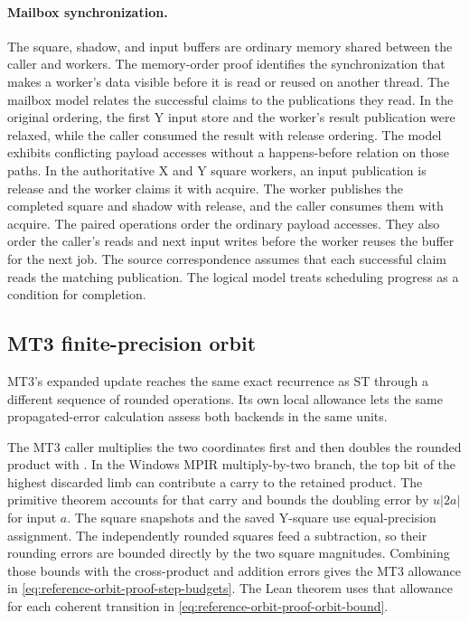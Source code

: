 \paragraph{Mailbox synchronization.}
The square, shadow, and input buffers are ordinary memory shared between
the caller and workers. The memory-order proof identifies the
synchronization that makes a worker's data visible before it is read or
reused on another thread.
The mailbox model relates the successful claims to the publications they
read. In the original ordering, the first Y input store and the worker's
result publication were relaxed, while the caller consumed the result with
release ordering. The model exhibits conflicting payload accesses without a
happens-before relation on those paths. In the authoritative X and Y square
workers, an input publication is release and the worker claims it with
acquire. The worker publishes the completed square and shadow with release,
and the caller consumes them with acquire. The paired operations order the
ordinary payload accesses. They also order the caller's reads and next
input writes before the worker reuses the buffer for the next job.
The source correspondence assumes that each successful claim reads the
matching publication. The logical model treats scheduling progress as a
condition for completion.

\subsection{MT3 finite-precision orbit}
\label{subsec:reference-orbit-proof-mt3-precision}

MT3's expanded update reaches the same exact recurrence as ST through a
different sequence of rounded operations. Its own local allowance lets the
same propagated-error calculation assess both backends in the same units.

The MT3 caller multiplies the two coordinates first and then doubles the
rounded product with . In the Windows MPIR multiply-by-two
branch, the top bit of the highest discarded limb can contribute a carry
to the retained product. The primitive theorem accounts for that carry
and bounds the doubling error by $u|2a|$ for input $a$. The square
snapshots and the saved Y-square use equal-precision assignment. The
independently rounded squares feed a subtraction, so their rounding errors are
bounded directly by the two square magnitudes. Combining those bounds with the
cross-product and addition errors gives the MT3 allowance in
\eqref{eq:reference-orbit-proof-step-budgets}. The Lean theorem
 uses that allowance for each coherent
transition in \eqref{eq:reference-orbit-proof-orbit-bound}.


